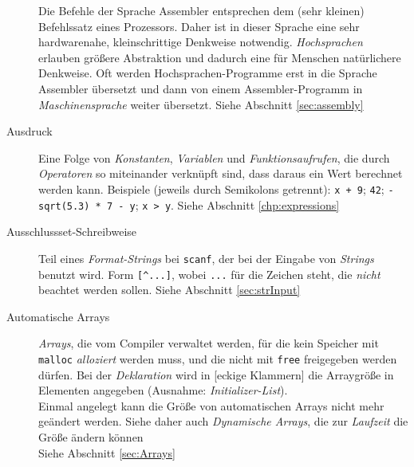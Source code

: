 \begin{appendices}
\begin{description}
	Die Befehle der Sprache Assembler entsprechen dem (sehr kleinen) Befehlssatz eines Prozessors. Daher
	ist in dieser Sprache eine sehr hardwarenahe, kleinschrittige Denkweise notwendig.\newline
	\emph{Hochsprachen} erlauben größere Abstraktion und dadurch eine für Menschen natürlichere
	Denkweise. Oft werden Hochsprachen-Programme erst in die Sprache Assembler übersetzt und dann von
	einem Assembler-Programm in \emph{Maschinensprache} weiter übersetzt.\newline
	Siehe Abschnitt \ref{sec:assembly}
\item[Ausdruck] Eine Folge von \emph{Konstanten}, \emph{Variablen} und \emph{Funktionsaufrufen}, die
	durch \emph{Operatoren} so miteinander verknüpft sind, dass daraus ein Wert berechnet werden kann.
	\newline
	Beispiele (jeweils durch Semikolons getrennt): \texttt{x + 9}; \texttt{42}; 
	\texttt{-sqrt(5.3) * 7 - y}; \texttt{x > y}.\newline
	Siehe Abschnitt \ref{chp:expressions}
\item[Ausschlussset-Schreibweise] Teil eines \emph{Format-Strings} bei \texttt{scanf}, der bei der
	Eingabe von \emph{Strings} benutzt wird. Form \texttt{[^...]}, wobei \texttt{...} für die
	Zeichen steht, die \emph{nicht} beachtet werden sollen.\newline
	Siehe Abschnitt \ref{sec:strInput}
\item[Automatische Arrays] \emph{Arrays}, die vom Compiler verwaltet werden, \ie für die kein
	Speicher mit \texttt{malloc} \emph{alloziert} werden muss, und die nicht mit \texttt{free}
	freigegeben werden dürfen. Bei der \emph{Deklaration} wird in [eckige Klammern] die Arraygröße in
	Elementen angegeben (Ausnahme: \emph{Initializer-List}).\\
	Einmal angelegt kann die Größe von automatischen Arrays nicht mehr geändert werden. Siehe daher auch 
	\emph{Dynamische Arrays}, die zur \emph{Laufzeit} die Größe ändern können\\
	Siehe Abschnitt \ref{sec:Arrays}


\end{description}
\end{appendices}
